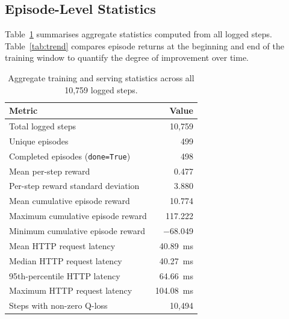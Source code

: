 \documentclass[11pt]{article}
\begin{document}
\subsection{Episode-Level Statistics}

Table~\ref{tab:core} summarises aggregate statistics computed from all
logged steps. Table~\ref{tab:trend} compares episode returns at the
beginning and end of the training window to quantify the degree of
improvement over time.

\begin{table}[htbp]
  \centering
  \caption{Aggregate training and serving statistics across all
    10{,}759 logged steps.}
  \label{tab:core}
  \begin{tabular}{lr}
    \toprule
    Metric & Value \\
    \midrule
    Total logged steps                    & 10{,}759 \\
    Unique episodes                       & 499 \\
    Completed episodes (\texttt{done=True}) & 498 \\
    Mean per-step reward                  & 0.477 \\
    Per-step reward standard deviation    & 3.880 \\
    Mean cumulative episode reward        & 10.774 \\
    Maximum cumulative episode reward     & 117.222 \\
    Minimum cumulative episode reward     & $-$68.049 \\
    Mean HTTP request latency             & \SI{40.89}{ms} \\
    Median HTTP request latency           & \SI{40.27}{ms} \\
    95th-percentile HTTP latency          & \SI{64.66}{ms} \\
    Maximum HTTP request latency          & \SI{104.08}{ms} \\
    Steps with non-zero Q-loss            & 10{,}494 \\
    \bottomrule
  \end{tabular}
\end{table}
\end{document}
